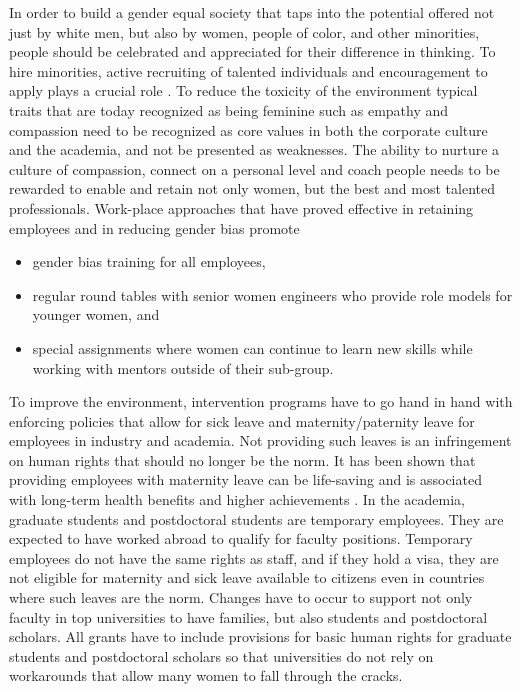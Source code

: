 \documentclass[utf8]{frontiersSCNS} %
\begin{document}
In order to build a gender equal society that taps into the potential offered not just by white men, but also by women, people of color, and other minorities, people should be celebrated and appreciated for their difference in thinking. To hire minorities, active recruiting of talented individuals and encouragement to apply plays a crucial role \citep{2018Report}. To reduce the toxicity of the environment typical traits that are today recognized as being feminine such as empathy and compassion need to be recognized as core values in both the corporate culture and the academia, and not be presented as weaknesses. The ability to nurture a culture of compassion, connect on a personal level and coach people needs to be rewarded to enable and retain not only women, but the best and most talented professionals. Work-place approaches that have proved effective in retaining employees and in reducing gender bias promote
\begin{itemize}
\item gender bias training for all employees,
\item regular round tables with senior women engineers who provide role models for younger women, and 
\item special assignments where women can continue to learn new skills while working with mentors outside of their sub-group. 
\end{itemize}

To improve the environment, intervention programs have to go hand in hand with enforcing policies that allow for sick leave and maternity/paternity leave for employees in industry and academia.  Not providing such leaves is an infringement on human rights that should no longer be the norm. It has been shown that providing employees with maternity leave  can be life-saving \citep{ceron1996risk,del2012intrafamily,eidelman2012breastfeeding} and is associated with long-term health benefits and higher achievements \citep{berger2005maternity,carneiro2015flying}. In the academia, graduate students and postdoctoral students are temporary employees. They are expected to have worked abroad to qualify for faculty positions. Temporary employees do not have the same rights as staff, and if they hold a visa, they are not eligible for maternity and sick leave available to citizens even in countries where such leaves are the norm. Changes have to occur to support not only faculty in top universities to have families, but also students and postdoctoral scholars. All grants have to include provisions for basic human rights for graduate students and postdoctoral scholars so that universities do not rely on workarounds that allow many women to fall through the cracks. %
\end{document}
